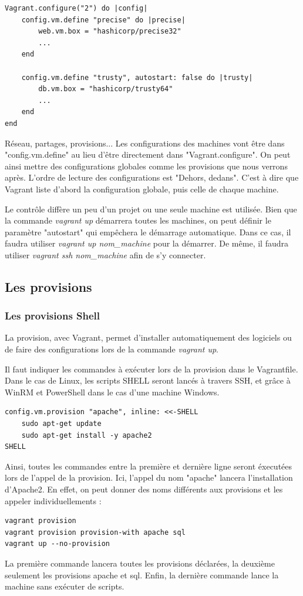 \documentclass[12pt,a4paper]{article}
\begin{document}
\begin{lstlisting}
Vagrant.configure("2") do |config|
	config.vm.define "precise" do |precise|
		web.vm.box = "hashicorp/precise32"
		...
	end
	
	config.vm.define "trusty", autostart: false do |trusty|
		db.vm.box = "hashicorp/trusty64"
		...
	end
end
\end{lstlisting}
Réseau, partages, provisions... Les configurations des machines vont être dans "config.vm.define" au lieu d'être directement dans "Vagrant.configure". On peut ainsi mettre des configurations globales comme les provisions que nous verrons après. L'ordre de lecture des configurations est "Dehors, dedans". C'est à dire que Vagrant liste d'abord la configuration globale, puis celle de chaque machine.

	Le contrôle diffère un peu d'un projet ou une seule machine est utilisée. Bien que la commande \textit{vagrant up} démarrera toutes les machines, on peut définir le paramètre "autostart" qui empêchera le démarrage automatique. Dans ce cas, il faudra utiliser \textit{vagrant up nom\_machine} pour la démarrer. De même, il faudra utiliser \textit{vagrant ssh nom\_machine} afin de s'y connecter.

\subsection{Les provisions}

\subsubsection{Les provisions Shell}
La provision, avec Vagrant, permet d'installer automatiquement des logiciels ou de faire des configurations lors de la commande \textit{vagrant up}. 

Il faut indiquer les commandes à exécuter lors de la provision dans le Vagrantfile. Dans le cas de Linux, les scripts SHELL seront lancés à travers SSH, et grâce à WinRM et PowerShell dans le cas d'une machine Windows.
\begin{lstlisting}
config.vm.provision "apache", inline: <<-SHELL
	sudo apt-get update
	sudo apt-get install -y apache2
SHELL
\end{lstlisting}
Ainsi, toutes les commandes entre la première et dernière ligne seront éxecutées lors de l'appel de la provision. Ici, l'appel du nom "apache" lancera l'installation d'Apache2. En effet, on peut donner des noms différents aux provisions et les appeler individuellements :
\begin{lstlisting}
vagrant provision
vagrant provision provision-with apache sql  
vagrant up --no-provision
\end{lstlisting}
La première commande lancera toutes les provisions déclarées, la deuxième seulement les provisions apache et sql. Enfin, la dernière commande lance la machine sans exécuter de scripts.
\end{document}
